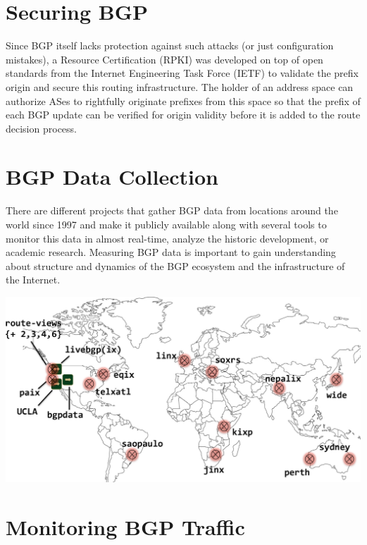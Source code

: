 \documentclass[a0,portrait,posterdraft]{a0poster}
\begin{document}
\begin{mybox}
\begin{multicols}{3}
\section*{Securing BGP}

Since BGP itself lacks protection against such attacks (or just configuration
mistakes), a Resource Certification (RPKI) was developed on top of open
standards from the Internet Engineering Task Force (IETF) to validate the prefix
origin and secure this routing infrastructure. The holder of an address space
can authorize ASes to rightfully originate prefixes from this space so that the
prefix of each BGP update can be verified for origin validity before it is added
to the route decision process.

\section*{BGP Data Collection}

There are different projects that gather BGP data from locations around the
world since 1997 and make it publicly available along with several tools to
monitor this data in almost real-time, analyze the historic development, or
academic research. Measuring BGP data is important to gain understanding about
structure and dynamics of the BGP ecosystem and the infrastructure of the
Internet.

\vfill
\columnbreak

\begin{center}\vspace{1cm}
\includegraphics[width=0.9\linewidth,interpolate]{routeviews_33}
\end{center}\vspace{1cm}


\section*{Monitoring BGP Traffic}


\end{multicols}
\end{mybox}
\end{document}

